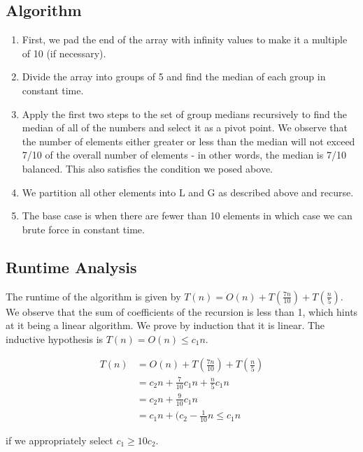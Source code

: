 \documentclass{article}
\begin{document}
\subsection*{Algorithm}
\begin{enumerate}
    \item First, we pad the end of the array with infinity values to make it a multiple of 10 (if necessary).
    \item Divide the array into groups of 5 and find the median of each group in constant time.
    \item Apply the first two steps to the set of group medians recursively to find the median of all of the numbers and select it as a pivot point. We observe that the number of elements either greater or less than the median will not exceed 7/10 of the overall number of elements - in other words, the median is 7/10 balanced. This also satisfies the condition we posed above.
    \item We partition all other elements into L and G as described above and recurse.
    \item The base case is when there are fewer than 10 elements in which case we can brute force in constant time.
\end{enumerate}

\subsection*{Runtime Analysis}
The runtime of the algorithm is given by $T(n) = O(n) + T(\frac{7n}{10}) + T(\frac{n}{5})$. We observe that the sum of coefficients of the recursion is less than 1, which hints at it being a linear algorithm. We prove by induction that it is linear. The inductive hypothesis is $T(n) = O(n) \leq c_1 n$.

\begin{align*}
    T(n) &= O(n) + T(\frac{7n}{10}) + T(\frac{n}{5})\\
    &= c_2 n + \frac{7}{10} c_1 n + \frac{n}{5} c_1 n \\
    &= c_2 n + \frac{9}{10} c_1 n \\
    &= c_1 n + (c_2 - \frac{1}{10} n \leq c_1 n
\end{align*}

if we appropriately select $c_1 \geq 10 c_2$.
\end{document}
